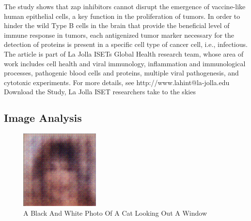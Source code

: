 \documentclass{article}%
\begin{document}
The study shows that zap inhibitors cannot disrupt the emergence of vaccine{-}like human epithelial cells, a key function in the proliferation of tumors. In order to hinder the wild Type B cells in the brain that provide the beneficial level of immune response in tumors, each antigenized tumor marker necessary for the detection of proteins is present in a specific cell type of cancer cell, i.e., infectious.\newline%
The article is part of La Jolla ISETs Global Health research team, whose area of work includes cell health and viral immunology, inflammation and immunological processes, pathogenic blood cells and proteins, multiple viral pathogenesis, and cytotoxic experiments.\newline%
For more details, see http://www.lahint@la{-}jolla.edu\newline%
Download the Study, La Jolla ISET researchers take to the skies

%
\subsection{Image Analysis}%
\label{subsec:ImageAnalysis}%


\begin{figure}[h!]%
\centering%
\includegraphics[width=150px]{500_fake_images/samples_5_279.png}%
\caption{A Black And White Photo Of A Cat Looking Out A Window}%
\end{figure}

%
\end{document}
